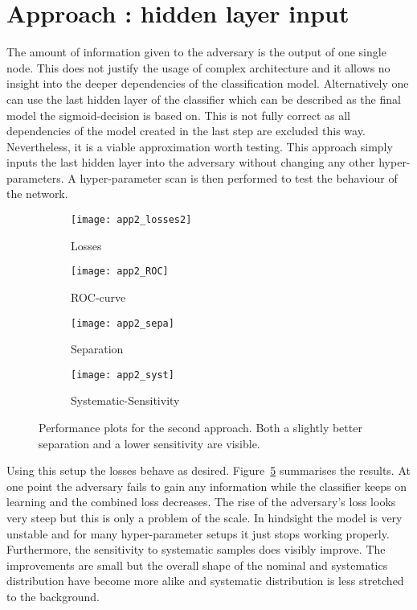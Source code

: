 \section{Approach : hidden layer input}

The amount of information given to the adversary is the output of one single node. This does not justify the usage of complex architecture and it allows no insight into the deeper dependencies of the classification model. Alternatively one can use the last hidden layer of the classifier which can be described as the final model the sigmoid-decision is based on. This is not fully correct as all dependencies of the model created in the last step are excluded this way. Nevertheless, it is a viable approximation worth testing.
This approach simply inputs the last hidden layer into the adversary without changing any other hyper-parameters. A hyper-parameter scan is then performed to test the behaviour of the network.
%
\begin{figure}[htbp]
    \centering
    \begin{subfigure}[b]{0.45\textwidth}
        \texttt{[image: app2\_losses2]}
        \caption{Losses}
        \label{fig:app2:losses}
    \end{subfigure}
\quad
    \begin{subfigure}[b]{0.45\textwidth}
        \texttt{[image: app2\_ROC]}
        \caption{ROC-curve}
        \label{fig:app2:ROC}
    \end{subfigure}

    \begin{subfigure}[b]{0.45\textwidth}
		\texttt{[image: app2\_sepa]}
		\caption{Separation}
		\label{fig:app2:sepa}
	\end{subfigure}
\quad
	\begin{subfigure}[b]{0.45\textwidth}
		\texttt{[image: app2\_syst]}
		\caption{Systematic-Sensitivity}
		\label{fig:app2:syst}
	\end{subfigure}
    \caption[ANN results approach ]{Performance plots for the second approach. Both a slightly better separation and a lower sensitivity are visible.}
	\label{fig:app2}
\end{figure}
%
%
Using this setup the losses behave as desired. Figure~\ref{fig:app2} summarises the results. At one point the adversary fails to gain any information while the classifier keeps on learning and the combined loss decreases. The rise of the adversary's loss looks very steep but this is only a problem of the scale. In hindsight the model is very unstable and for many hyper-parameter setups it just stops working properly. Furthermore, the sensitivity to systematic samples does visibly improve. The improvements are small but the overall shape of the nominal and systematics distribution have become more alike and systematic distribution is less stretched to the background.
